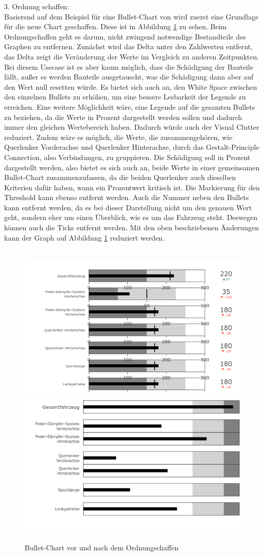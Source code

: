 3. Ordnung schaffen:\\
Basierend auf dem Beispiel für eine Bullet-Chart von \cite{Plotly.2024c} wird zuerst eine Grundlage für die neue Chart geschaffen. Diese ist in Abbildung \ref{fig:bullet_chart_after} zu sehen.
Beim Ordnungschaffen geht es darum, nicht zwingend notwendige Bestandteile des Graphen zu entfernen. Zunächst wird das Delta unter den Zahlwerten entfernt, das Delta zeigt die Veränderung der Werte im Vergleich zu anderen Zeitpunkten. Bei diesem Usecase ist es aber kaum möglich, dass die Schädigung der Bauteile fällt, außer es werden Bauteile ausgetauscht, was die Schädigung dann aber auf den Wert null resetten würde. Es bietet sich auch an, den White Space zwischen den einzelnen Bullets zu erhöhen, um eine bessere Lesbarkeit der Legende zu erreichen. Eine weitere Möglichkeit wäre, eine Legende auf die gesamten Bullets zu beziehen, da die Werte in Prozent dargestellt werden sollen und dadurch immer den gleichen Wertebereich haben. Dadurch würde auch der Visual Clutter reduziert. Zudem wäre es möglich, die Werte, die \glqq zusammengehören\grqq{}, wie Querlenker Vorderachse und Querlenker Hinterachse, durch das Gestalt-Principle  \cite{Schwabish.2021} Connection, also Verbindungen, zu gruppieren. Die Schädigung soll in Prozent dargestellt werden, also bietet es sich auch an, beide Werte in einer gemeinsamen Bullet-Chart zusammenzufassen, da die beiden Querlenker auch dieselben Kriterien dafür haben, wann ein Prozentwert kritisch ist. Die Markierung für den Threshold kann ebenso entfernt werden. Auch die Nummer neben den Bullets kann entfernt werden, da es bei dieser Darstellung nicht um den genauen Wert geht, sondern eher um einen Überblick, wie es um das Fahrzeug steht. Deswegen können auch die Ticks entfernt werden. Mit den oben beschriebenen Änderungen kann der Graph auf Abbildung \ref{fig:bullet_chart_after} reduziert werden.\\\\
\begin{figure}
\centering
\includegraphics[width=.45\textwidth]{gfx/Bullet_Chart_Before.png} %
\includegraphics[width=.45\textwidth]{gfx/Bullet_Chart_After.png}
\caption{Bullet-Chart vor und nach dem Ordnungschaffen}
\label{fig:bullet_chart_after}
\end{figure}
